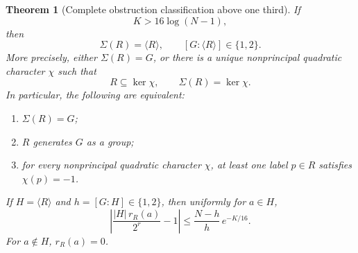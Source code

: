 \documentclass[11pt,a4paper]{article}
\newtheorem{theorem}{Theorem}[section]
\theoremstyle{definition}
\theoremstyle{remark}
\begin{document}
\begin{theorem}[Complete obstruction classification above one third]\label{p-thm:finite-inverse}
If
\begin{equation}\label{p-eq:inverse-threshold}
 K>16\log(N-1),
\end{equation}
then
\[
 \Sigma(R)=\langle R\rangle,
 \qquad [G:\langle R\rangle]\in\{1,2\}.
\]
More precisely, either $\Sigma(R)=G$, or there is a unique nonprincipal
quadratic character $\chi$ such that
\[
 R\subseteq\ker\chi,
 \qquad \Sigma(R)=\ker\chi.
\]
In particular, the following are equivalent:
\begin{enumerate}
\item $\Sigma(R)=G$;
\item $R$ generates $G$ as a group;
\item for every nonprincipal quadratic character $\chi$, at least one
label $p\in R$ satisfies $\chi(p)=-1$.
\end{enumerate}
If $H=\langle R\rangle$ and $h=[G:H]\in\{1,2\}$, then uniformly for
$a\in H$,
\begin{equation}\label{p-eq:inverse-equidistribution}
 \left|\frac{|H|\,r_R(a)}{2^r}-1\right|
 \leq\frac{N-h}{h}\,e^{-K/16}.
\end{equation}
For $a\notin H$, $r_R(a)=0$.
\end{theorem}
\end{document}
